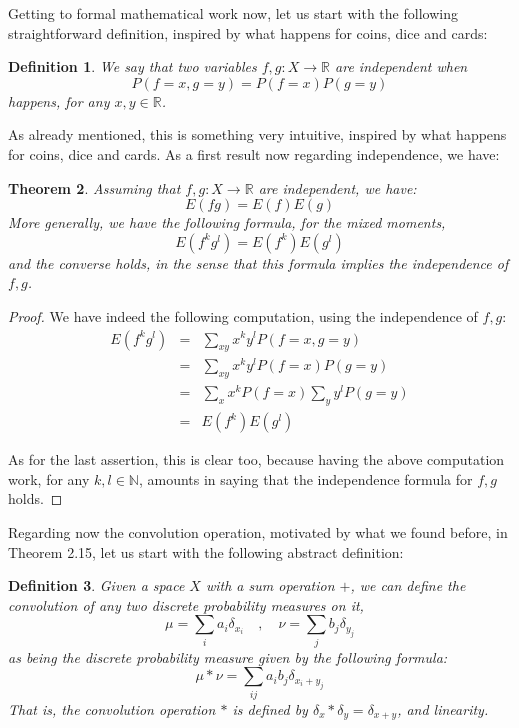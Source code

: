 \documentclass[12pt]{amsbook}
\newtheorem{theorem}{Theorem}[chapter]
\newtheorem{definition}[theorem]{Definition}
\begin{document}
Getting to formal mathematical work now, let us start with the following straightforward definition, inspired by what happens for coins, dice and cards:

\begin{definition}
We say that two variables $f,g:X\to\mathbb R$ are independent when
$$P(f=x,g=y)=P(f=x)P(g=y)$$
happens, for any $x,y\in\mathbb R$.
\end{definition}

As already mentioned, this is something very intuitive, inspired by what happens for coins, dice and cards. As a first result now regarding independence, we have:

\begin{theorem}
Assuming that $f,g:X\to\mathbb R$ are independent, we have:
$$E(fg)=E(f)E(g)$$
More generally, we have the following formula, for the mixed moments,
$$E(f^kg^l)=E(f^k)E(g^l)$$
and the converse holds, in the sense that this formula implies the independence of $f,g$.
\end{theorem}

\begin{proof}
We have indeed the following computation, using the independence of $f,g$:
\begin{eqnarray*}
E(f^kg^l)
&=&\sum_{xy}x^ky^lP(f=x,g=y)\\
&=&\sum_{xy}x^ky^lP(f=x)P(g=y)\\
&=&\sum_xx^kP(f=x)\sum_yy^lP(g=y)\\
&=&E(f^k)E(g^l)
\end{eqnarray*}

As for the last assertion, this is clear too, because having the above computation work, for any $k,l\in\mathbb N$, amounts in saying that the independence formula for $f,g$ holds.
\end{proof}

Regarding now the convolution operation, motivated by what we found before, in Theorem 2.15, let us start with the following abstract definition:

\begin{definition}
Given a space $X$ with a sum operation $+$, we can define the convolution of any two discrete probability measures on it,
$$\mu=\sum_ia_i\delta_{x_i}\quad,\quad \nu=\sum_jb_j\delta_{y_j}$$
as being the discrete probability measure given by the following formula:
$$\mu*\nu=\sum_{ij}a_ib_j\delta_{x_i+y_j}$$
That is, the convolution operation $*$ is defined by $\delta_x*\delta_y=\delta_{x+y}$, and linearity.
\end{definition}
\end{document}
